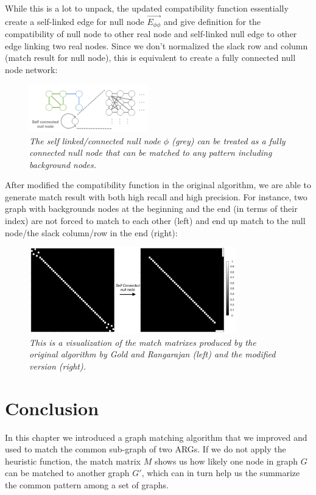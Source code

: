While this is a lot to unpack, the updated compatibility function essentially create a self-linked edge for null node $\overrightarrow{E_{\phi\phi}}$ and give definition for the compatibility of null node to other real node and self-linked null edge to other edge linking two real nodes. Since we don't normalized the slack row and column (match result for null node), this is equivalent to create a fully connected null node network:

\begin{figure}[h]
	\centering
	\captionsetup{justification=centering}
	\includegraphics[width=0.46\textwidth]{figs/null_node_network.png}
	\caption[Caption for LOF]{\emph{The self linked/connected null node $\phi$ (grey) can be treated as a fully connected null node that can be matched to any pattern including background nodes. }}
	\label{fig:stochastic}
\end{figure}

After modified the compatibility function in the original algorithm, we are able to generate match result with both high recall and high precision. For instance, two graph with backgrounds nodes at the beginning and the end (in terms of their index) are not forced to match to each other (left) and end up match to the null node/the slack column/row in the end (right):
\begin{figure}[h]
	\centering
	\captionsetup{justification=centering}
	\includegraphics[width=0.8\textwidth]{figs/null_node_improve.png}
	\caption[Caption for LOF]{\emph{This is a visualization of the match matrixes produced by the original algorithm by Gold and Rangarajan (left) and the modified version (right).}}
	\label{fig:stochastic}
\end{figure}

\section{Conclusion}


In this chapter we introduced a graph matching algorithm that we improved and used to match the common sub-graph of two ARGs. If we do not apply the heuristic function, the match matrix $M$ shows us how likely one node in graph $G$ can be matched to another graph $G'$, which can in turn help us the summarize the common pattern among a set of graphs.

